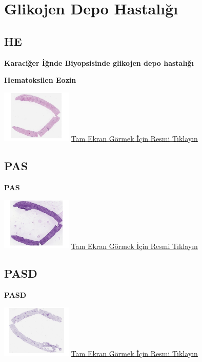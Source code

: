 \documentclass[
  letterpaper,
  DIV=11,
  numbers=noendperiod]{scrreprt}
\begin{document}
\hypertarget{sec-glikojen-depo-hastaligi}{%
\section{Glikojen Depo Hastalığı}\label{sec-glikojen-depo-hastaligi}}

\hypertarget{he}{%
\subsection{HE}\label{he}}

\textbf{Karaciğer İğnde Biyopsisinde glikojen depo hastalığı}

\textbf{Hematoksilen Eozin}

\href{https://images.patolojiatlasi.com/glycogenstorage/HE.html}{\includegraphics[width=0.25\textwidth,height=\textheight]{./screenshots/glycogenstorage-HE_screenshot.png}}
\href{https://images.patolojiatlasi.com/glycogenstorage/HE.html}{Tam
Ekran Görmek İçin Resmi Tıklayın}

\hypertarget{pas}{%
\subsection{PAS}\label{pas}}

\textbf{PAS}

\href{https://images.patolojiatlasi.com/glycogenstorage/PAS.html}{\includegraphics[width=0.25\textwidth,height=\textheight]{./screenshots/glycogenstorage-PAS_screenshot.png}}
\href{https://images.patolojiatlasi.com/glycogenstorage/PAS.html}{Tam
Ekran Görmek İçin Resmi Tıklayın}

\hypertarget{pasd}{%
\subsection{PASD}\label{pasd}}

\textbf{PASD}

\href{https://images.patolojiatlasi.com/glycogenstorage/PASD.html}{\includegraphics[width=0.25\textwidth,height=\textheight]{./screenshots/glycogenstorage-PASD_screenshot.png}}
\href{https://images.patolojiatlasi.com/glycogenstorage/PASD.html}{Tam
Ekran Görmek İçin Resmi Tıklayın}
\end{document}
